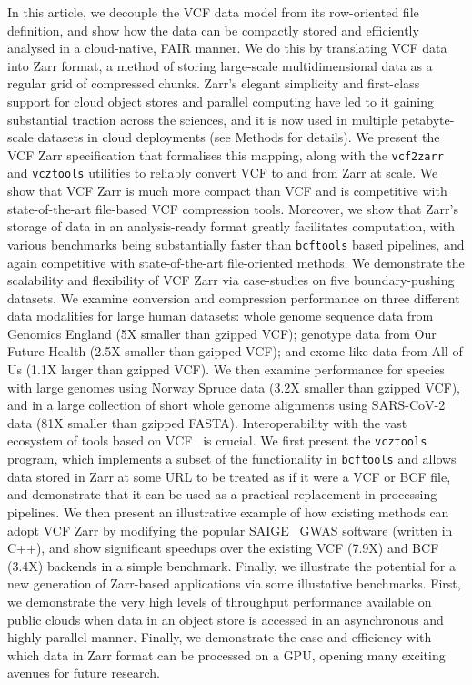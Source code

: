 \documentclass[a4paper,num-refs]{oup-contemporary}
\begin{document}
In this article, we decouple the VCF data model from its row-oriented
file definition, and show how the data can be
compactly stored and efficiently analysed in a cloud-native, FAIR manner.
We do this by translating VCF data into Zarr format,
a method of storing large-scale multidimensional data as a regular
grid of compressed chunks.
Zarr's elegant simplicity and first-class support for
cloud object stores and parallel computing have led to
it gaining substantial traction
across the sciences, and it is now used in multiple petabyte-scale
datasets in cloud deployments (see Methods for details).
We present the VCF Zarr specification that formalises this
mapping, along with the \texttt{vcf2zarr} and \texttt{vcztools} 
utilities to reliably convert VCF to and from Zarr at scale.
We show that VCF Zarr is much more compact than
VCF and is competitive with state-of-the-art
file-based VCF compression tools.
Moreover, we show that Zarr's storage of data in an analysis-ready
format greatly facilitates computation,
with various benchmarks being substantially faster than
\texttt{bcftools} based pipelines, and again competitive
with state-of-the-art file-oriented methods. 
We demonstrate the scalability and flexibility of VCF Zarr
via case-studies on five boundary-pushing datasets.
We examine conversion and compression performance on three different
data modalities for large human datasets: whole genome sequence
data from Genomics England (5X smaller than gzipped VCF);
genotype data from Our Future Health (2.5X smaller than gzipped VCF);
and exome-like data from All of Us (1.1X larger than gzipped VCF). 
We then examine performance 
for species with large genomes using Norway Spruce data (3.2X smaller
than gzipped VCF),
and in a large collection of short whole genome alignments
using SARS-CoV-2 data 
(81X smaller than gzipped FASTA). 
Interoperability with the vast ecosystem of tools
based on VCF~\citep{danecek2021twelve,garrison2022spectrum}
is crucial. 
We first present the \texttt{vcztools} program,
which implements a subset of the functionality in \texttt{bcftools}
and allows data stored in Zarr at some URL to be 
treated as if it were a VCF or BCF file,
and demonstrate that it can be used as a practical replacement 
in processing pipelines.
We then present an illustrative example of how existing
methods can adopt VCF Zarr by modifying the popular 
SAIGE~\cite{zhou2018efficiently, zhou2020scalable} GWAS software
(written in C++), and show significant speedups over the existing 
VCF (7.9X) and BCF (3.4X) backends in a simple benchmark.
Finally, we illustrate the potential 
for a new generation of Zarr-based applications via some illustative
benchmarks. First, we demonstrate the very high levels of throughput 
performance available on public clouds when data in an object 
store is accessed in an asynchronous and highly parallel manner.
Finally, we demonstrate the ease and efficiency with which data
in Zarr format can be processed on a GPU, opening many exciting
avenues for future research.
\end{document}
